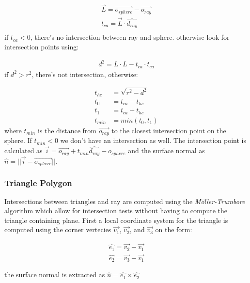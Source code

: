 \documentclass[a4paper, twocolumn]{article}
\begin{document}
        \begin{align*}
            \vec{L} = \vec{o_{sphere}} - \vec{o_{ray}} \\
            t_{ca} = \vec{L} \cdot  \hat{d_{ray}} \\
        \end{align*}
        if \(t_{ca} < 0\), there's no intersection between ray and sphere. otherwise look for intersection points using:
        
        \begin{align*}
            d^2 = L \cdot L - t_{ca} \cdot t_{ca}
        \end{align*}
        if \(d^2 > r^2\), there's not intersection, otherwise:

        \begin{align*}
            t_{hc} &= \sqrt{r^2 - d^2} \\
            t_0 &= t_{ca} - t_{hc} \\
            t_1 &= t_{ca} + t_{hc} \\
            t_{min} &= min(t_0, t_1)
        \end{align*}
        where \(t_{min}\) is the distance from \(\vec{o_{ray}}\) to the closest intersection point on the sphere. If \(t_{min}  < 0\) we don't have an intersection as well. The intersection point is calculated as  \(\vec{i} = \vec{o_{ray}} + t_{min} \hat{d_{ray}} - o_{sphere} \) and the surface normal as \( \hat{n} = || \vec{i} - \vec{o_{sphere}} || \).

        \subsubsection{Triangle Polygon} \label{sec:triangle_polygon}
        
        Intersections between triangles and ray are computed using the \textit{Möller-Trumbore} algorithm which allow for intersection tests without having to compute the triangle containing plane. First a local coordinate system for the triangle is computed using the corner vertecies \(\vec{v_1}\), \(\vec{v_2}\), and \(\vec{v_3}\) on the form:

\begin{align*}
    \hat{e_1} = \vec{v_2} - \vec{v_1} \\
    \hat{e_2} = \vec{v_3} - \vec{v_1}
\end{align*}

the surface normal is extracted as \( \hat{n} =\hat{e_1} \times \hat{e_2} \)
\end{document}
